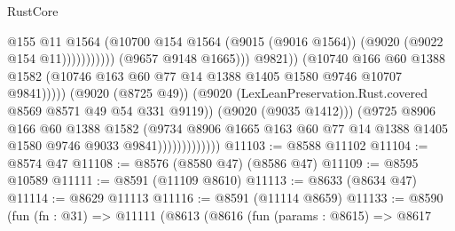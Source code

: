 \begin{lexlean}{RustCore}
\begin{coremodule}
                                                          @155
                                                          @11
                                                          @1564
                                                          (@10700
                                                            @154
                                                            @1564
                                                            (@9015 (@9016 @1564))
                                                            (@9020 (@9022 @154 @11)))))))))))
                                          (@9657 @9148 @1665)))
                                      @9821))
                                  (@10740
                                    @166
                                    @60
                                    @1388
                                    @1582
                                    (@10746
                                      @163
                                      @60
                                      @77
                                      @14
                                      @1388
                                      @1405
                                      @1580
                                      @9746
                                      @10707
                                      @9841)))))
                            (@9020 (@8725 @49))
                            (@9020
                              (LexLeanPreservation.Rust.covered @8569 @8571 @49 @54 @331 @9119))
                            (@9020 (@9035 @1412)))
                          (@9725
                            @8906
                            @166
                            @60
                            @1388
                            @1582
                            (@9734
                              @8906
                              @1665
                              @163
                              @60
                              @77
                              @14
                              @1388
                              @1405
                              @1580
                              @9746
                              @9033
                              @9841)))))))))))))
@11103 := @8588 @11102
@11104 := @8574 @47
@11108 := @8576 (@8580 @47) (@8586 @47)
@11109 := @8595 @10589
@11111 := @8591 (@11109 @8610)
@11113 := @8633 (@8634 @47)
@11114 := @8629 @11113
@11116 := @8591 (@11114 @8659)
@11133 := @8590
    (fun (fn : @31) =>
    @11111
      (@8613
        (@8616
          (fun (params : @8615) =>
          @8617

\end{coremodule}
\end{lexlean}

